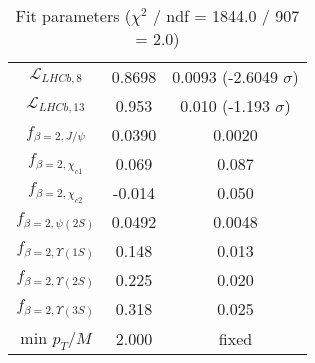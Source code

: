 \begin{table}[h!]
\begin{tabular}{c|c|c}
$\mathcal L_{LHCb,8}$ & 0.8698 & 0.0093 (-2.6049 $\sigma$) \\
$\mathcal L_{LHCb,13}$ & 0.953 & 0.010 (-1.193 $\sigma$) \\
$f_{\beta=2,J/\psi}$ & 0.0390 & 0.0020 \\
$f_{\beta=2,\chi_{c1}}$ & 0.069 & 0.087 \\
$f_{\beta=2,\chi_{c2}}$ & -0.014 & 0.050 \\
$f_{\beta=2,\psi(2S)}$ & 0.0492 & 0.0048 \\
$f_{\beta=2,\Upsilon(1S)}$ & 0.148 & 0.013 \\
$f_{\beta=2,\Upsilon(2S)}$ & 0.225 & 0.020 \\
$f_{\beta=2,\Upsilon(3S)}$ & 0.318 & 0.025 \\
min $p_T/M$ & 2.000 & fixed \\
\end{tabular}
\caption{Fit parameters ($\chi^2$ / ndf = 1844.0 / 907 = 2.0)}
\end{table}
